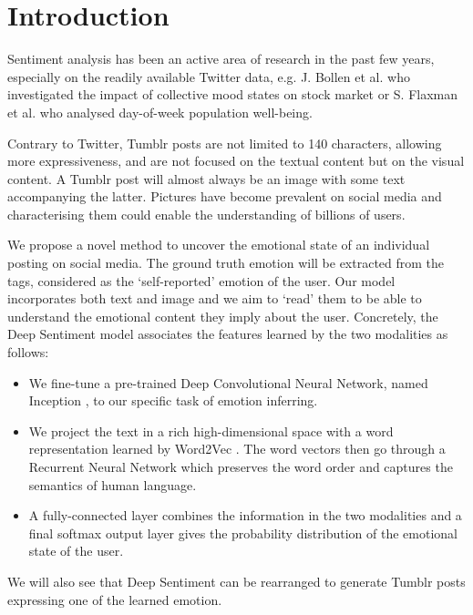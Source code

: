 \chapter{Introduction}

Sentiment analysis has been an active area of research in the past few years, especially on the readily available Twitter data, e.g. J. Bollen et al. \cite{bollen} who investigated the impact of collective mood states on stock market or S. Flaxman et al. \cite{seth-twitter} who analysed day-of-week population well-being.

Contrary to Twitter, Tumblr posts are not limited to 140 characters, allowing more expressiveness, and are not focused on the textual content but on the visual content. A Tumblr post will almost always be an image with some text accompanying the latter. Pictures have become prevalent on social media and characterising them could enable the understanding of billions of users. 

We propose a novel method to uncover the emotional state of an individual posting on social media. The ground truth emotion will be extracted from the tags, considered as the `self-reported' emotion of the user. Our model incorporates both text and image and we aim to `read' them to be able to understand the emotional content they imply about the user. Concretely, the Deep Sentiment model associates the features learned by the two modalities as follows:

\begin{itemize}
    \item We fine-tune a pre-trained Deep Convolutional Neural Network, named Inception \cite{googlenet}, to our specific task of emotion inferring.
    \item We project the text in a rich high-dimensional space with a word representation learned by Word2Vec \cite{word2vec}. The word vectors then go through a Recurrent Neural Network which preserves the word order and captures the semantics of human language.
    \item A fully-connected layer combines the information in the two modalities and a final softmax output layer gives the probability distribution of the emotional state of the user.
\end{itemize}

We will also see that Deep Sentiment can be rearranged to generate Tumblr posts expressing one of the learned emotion.









